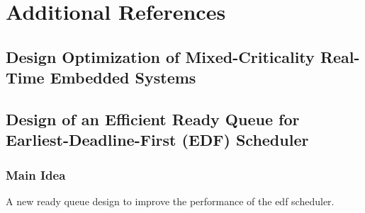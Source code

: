 \section{Additional References}
\subsection{Design Optimization of Mixed-Criticality Real-Time Embedded Systems}

\subsection{Design of an Efficient Ready Queue for Earliest-Deadline-First (EDF) Scheduler}
\subsubsection{Main Idea}
A new ready queue design to improve the performance of the edf scheduler.
